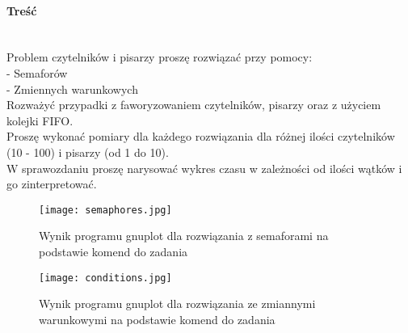 \paragraph{Treść}~\\
Problem czytelników i pisarzy proszę rozwiązać przy pomocy:\\
- Semaforów\\
- Zmiennych warunkowych\\
Rozważyć przypadki z faworyzowaniem czytelników, pisarzy oraz z użyciem kolejki FIFO.\\
Proszę wykonać pomiary dla każdego rozwiązania dla różnej ilości czytelników (10 - 100) i pisarzy (od 1 do 10).\\
W sprawozdaniu proszę narysować wykres czasu w zależności od ilości wątków i go zinterpretować.













\begin{figure}[p]
  \caption{Wynik programu gnuplot dla rozwiązania z semaforami na podstawie komend do zadania}
  \label{fig:SemaphoresJpg}
  \centering
  \texttt{[image: semaphores.jpg]}
\end{figure}

\begin{figure}[p]
  \caption{Wynik programu gnuplot dla rozwiązania ze zmiannymi warunkowymi na podstawie komend do zadania}
  \label{fig:ConditionsJpg}
  \centering
  \texttt{[image: conditions.jpg]}
\end{figure}

